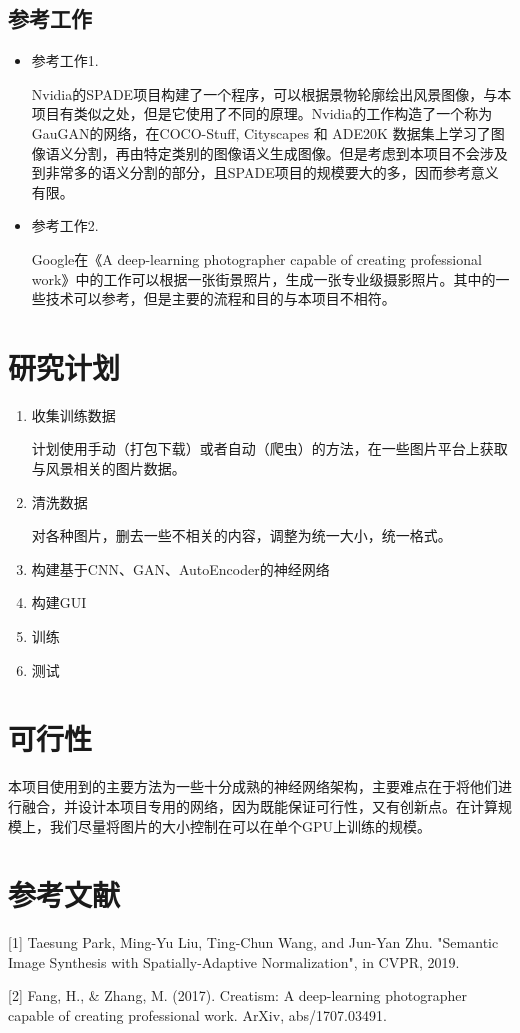 \documentclass{article}
\begin{document}
\subsection{参考工作}

\begin{itemize}

\item 参考工作1.

Nvidia的SPADE项目构建了一个程序，可以根据景物轮廓绘出风景图像，与本项目有类似之处，但是它使用了不同的原理。Nvidia的工作构造了一个称为GauGAN的网络，在COCO-Stuff, Cityscapes 和 ADE20K 数据集上学习了图像语义分割，再由特定类别的图像语义生成图像。但是考虑到本项目不会涉及到非常多的语义分割的部分，且SPADE项目的规模要大的多，因而参考意义有限。
\item 参考工作2.

Google在《A deep-learning photographer capable of creating professional work》中的工作可以根据一张街景照片，生成一张专业级摄影照片。其中的一些技术可以参考，但是主要的流程和目的与本项目不相符。
\end{itemize}

\section{研究计划}

\begin{enumerate}
	\item 收集训练数据
	
	计划使用手动（打包下载）或者自动（爬虫）的方法，在一些图片平台上获取与风景相关的图片数据。
	\item 清洗数据
  
  对各种图片，删去一些不相关的内容，调整为统一大小，统一格式。
	\item 构建基于CNN、GAN、AutoEncoder的神经网络
	\item 构建GUI
	\item 训练
	\item 测试
\end{enumerate}

\section{可行性}
本项目使用到的主要方法为一些十分成熟的神经网络架构，主要难点在于将他们进行融合，并设计本项目专用的网络，因为既能保证可行性，又有创新点。在计算规模上，我们尽量将图片的大小控制在可以在单个GPU上训练的规模。

\section{参考文献}
[1] Taesung Park, Ming-Yu Liu, Ting-Chun Wang, and Jun-Yan Zhu.
"Semantic Image Synthesis with Spatially-Adaptive Normalization", in CVPR, 2019.

[2] Fang, H., & Zhang, M. (2017). Creatism: A deep-learning photographer capable of creating professional work. ArXiv, abs/1707.03491.
\end{document}
